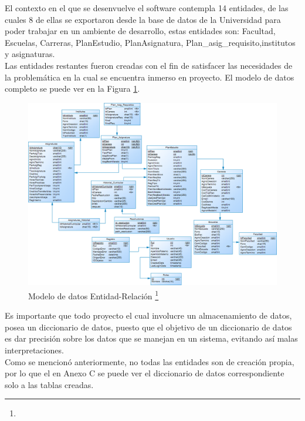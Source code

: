 	El contexto en el que se desenvuelve el software contempla 14 entidades, de las cuales 8 de ellas se exportaron desde la base de datos de la Universidad para poder trabajar en un ambiente de desarrollo, estas entidades son: Facultad, Escuelas, Carreras, PlanEstudio, PlanAsignatura, Plan\_asig\_requisito,institutos y asignaturas.
	\\
	
	Las entidades restantes fueron creadas con el fin de satisfacer las necesidades de la problemática en la cual se encuentra inmerso en proyecto. El modelo de datos completo se puede ver en la Figura \ref{Modelo_E_R}.
	\\
	
	\begin{figure}[H]
		\centering
		\includegraphics[width=1\textwidth]{images/Capitulo_3/Modelo_E_R.png}
		\caption[Modelo de datos Entidad-Relación]{Modelo de datos Entidad-Relación \footnote{}}
		\label{Modelo_E_R}
	\end{figure}
	
	
	Es importante que todo proyecto el cual involucre un almacenamiento de datos, posea un diccionario de datos, puesto que el  objetivo de un diccionario de datos  es dar precisión sobre los datos	que se manejan en un sistema, evitando así  malas interpretaciones.
	\\
	
	Como se mencionó anteriormente, no todas las entidades son de creación propia, por lo que el en Anexo C se puede ver el diccionario de datos correspondiente solo a las tablas creadas.
	
